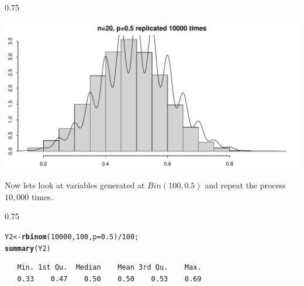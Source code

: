 \documentclass{beamer}\usepackage[]{graphicx}\usepackage[]{color}
\makeatletter
\newcommand{\hlnum}[1]{\textcolor[rgb]{0.2,0.2,0.2}{#1}}%
\newcommand{\hlopt}[1]{\textcolor[rgb]{0.102,0.102,0.102}{#1}}%
\newcommand{\hlstd}[1]{\textcolor[rgb]{0.102,0.102,0.102}{#1}}%
\newcommand{\hlkwb}[1]{\textcolor[rgb]{0.102,0.102,0.102}{#1}}%
\newcommand{\hlkwc}[1]{\textcolor[rgb]{0.2,0.2,0.2}{#1}}%
\newcommand{\hlkwd}[1]{\textcolor[rgb]{0.102,0.102,0.102}{\textbf{#1}}}%
\newenvironment{kframe}{%
 \def\at@end@of@kframe{}%
 \ifinner\ifhmode%
  \def\at@end@of@kframe{\end{minipage}}%
  \begin{minipage}{\columnwidth}%
 \fi\fi%
 \def\FrameCommand##1{\hskip\@totalleftmargin \hskip-\fboxsep
 \colorbox{shadecolor}{##1}\hskip-\fboxsep
     \hskip-\linewidth \hskip-\@totalleftmargin \hskip\columnwidth}%
 \MakeFramed {\advance\hsize-\width
   \@totalleftmargin\z@ \linewidth\hsize
   \@setminipage}}%
 {\par\unskip\endMakeFramed%
 \at@end@of@kframe}
\newenvironment{knitrout}{}{} %
\renewenvironment{knitrout}{\begin{spacing}{0.75}\begin{tiny}}{\end{tiny}\end{spacing}}
\makeatother
\begin{document}
\begin{frame}[fragile]

\begin{knitrout}\small
{}\color{fgcolor}

{\centering \includegraphics[width=0.89\linewidth]{figure/graphics-unnamed-chunk-15-1} 

}



\end{knitrout}

\end{frame}

\begin{frame}[fragile]

Now lets look at variables generated at $Bin(100,0.5)$ and repeat the process $10,000$ times.

\begin{knitrout}\small
{}\color{fgcolor}\begin{kframe}
\begin{alltt}
\hlstd{Y2} \hlkwb{<-} \hlkwd{rbinom}\hlstd{(}\hlnum{10000}\hlstd{,} \hlnum{100}\hlstd{,} \hlkwc{p}\hlstd{=}\hlnum{0.5}\hlstd{)}\hlopt{/} \hlnum{100}\hlstd{;}
\hlkwd{summary}\hlstd{(Y2)}
\end{alltt}
\begin{verbatim}
   Min. 1st Qu.  Median    Mean 3rd Qu.    Max. 
   0.33    0.47    0.50    0.50    0.53    0.69 
\end{verbatim}
\end{kframe}
\end{knitrout}

\end{frame}
\end{document}
